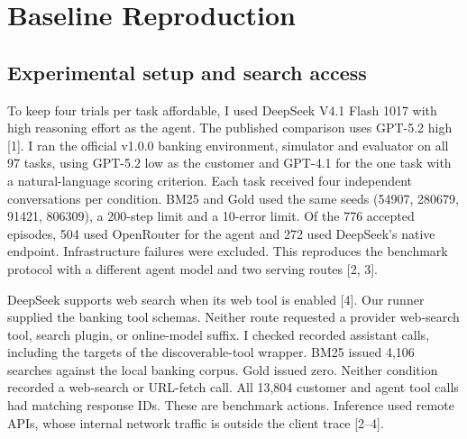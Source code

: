 \documentclass{article}
\begin{document}
\section{Baseline Reproduction}
\subsection{Experimental setup and search access}
To keep four trials per task affordable, I used DeepSeek V4.1 Flash 1017 with high reasoning effort as the agent. The published comparison uses GPT-5.2 high [1]. I ran the official v1.0.0 banking environment, simulator and evaluator on all 97 tasks, using GPT-5.2 low as the customer and GPT-4.1 for the one task with a natural-language scoring criterion. Each task received four independent conversations per condition. BM25 and Gold used the same seeds (54907, 280679, 91421, 806309), a 200-step limit and a 10-error limit. Of the 776 accepted episodes, 504 used OpenRouter for the agent and 272 used DeepSeek's native endpoint. Infrastructure failures were excluded. This reproduces the benchmark protocol with a different agent model and two serving routes [2, 3].

DeepSeek supports web search when its web tool is enabled [4]. Our runner supplied the banking tool schemas. Neither route requested a provider web-search tool, search plugin, or online-model suffix. I checked recorded assistant calls, including the targets of the discoverable-tool wrapper. BM25 issued 4,106 searches against the local banking corpus. Gold issued zero. Neither condition recorded a web-search or URL-fetch call. All 13,804 customer and agent tool calls had matching response IDs. These are benchmark actions. Inference used remote APIs, whose internal network traffic is outside the client trace [2--4].
\end{document}
